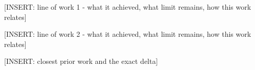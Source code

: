 [INSERT: line of work 1 - what it achieved, what limit remains, how this work relates]

[INSERT: line of work 2 - what it achieved, what limit remains, how this work relates]

[INSERT: closest prior work and the exact delta]
